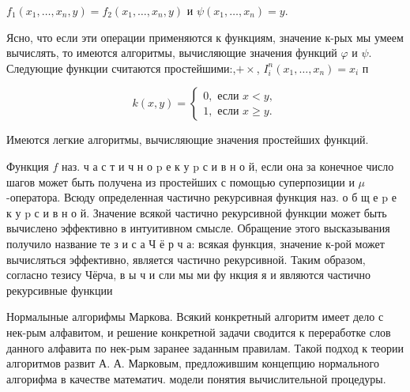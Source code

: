 \documentclass[10pt]{article}
\begin{document}
$f_{1}\left(x_{1}, \ldots, x_{n}, y\right)=f_{2}\left(x_{1}, \ldots, x_{n}, y\right)$ и $\psi\left(x_{1}, \ldots, x_{n}\right)=y$.



Ясно, что если эти операции применяются к функциям, значение к-рых мы умеем вычислять, то имеются алгоритмы, вычисляющие значения функций $\varphi$ и $\psi$. Следующие функции считаются простейшими:,$+ \times$, $I_{i}^{n}\left(x_{1}, \ldots, x_{n}\right)=x_{i}$ п



\[

k(x, y)=\left\{\begin{array}{l}

0, \text { если } x<y, \\

1, \text { если } x \geqslant y .

\end{array}\right.

\]



Имеются легкие алгоритмы, вычисляющие значения простейших функций.



Функция $f$ наз. ч а с т и ч н о $\mathrm{p}$ е к у $\mathrm{p}$ с и в н о й, если она за конечное число шагов может быть получена из простейших с помощью суперпозиции и $\mu$-оператора. Всюду определенная частично рекурсивная функция наз. о б щ е $\mathrm{p}$ е к у $\mathrm{p}$ с и в н о й. Значение всякой частично рекурсивной функции может быть вычислено эффективно в интуитивном смысле. Обращение этого высказывания получило название те з и с а Ч ё р ч а: всякая функция, значение к-рой может вычисляться эффективно, является частично рекурсивной. Таким образом, согласно тезису Чёрча, в ы ч и сли мы ми фу нкция я и являются частично рекурсивные функции



Нормалыные алгорифмы Маркова. Всякий конкретный алгоритм имеет дело с нек-рым алфавитом, и решение конкретной задачи сводится к переработке слов данного алфавита по нек-рым заранее заданным правилам. Такой подход к теории алгоритмов развит А. А. Марковым, предложившим концепцию нормального алгорифма в качестве математич. модели понятия вычислительной процедуры.
\end{document}

